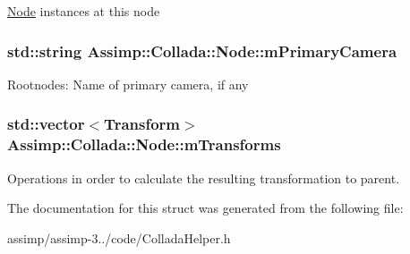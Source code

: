 \hyperlink{struct_assimp_1_1_collada_1_1_node}{Node} instances at this node \hypertarget{struct_assimp_1_1_collada_1_1_node_aa07a8151db92d1186896f934af451ad6}{
\subsubsection[{m\+Primary\+Camera}]{\setlength{\rightskip}{0pt plus 5cm}std\+::string Assimp\+::\+Collada\+::\+Node\+::m\+Primary\+Camera}}\label{struct_assimp_1_1_collada_1_1_node_aa07a8151db92d1186896f934af451ad6}
Rootnodes\+: Name of primary camera, if any \hypertarget{struct_assimp_1_1_collada_1_1_node_a13b873fd4c2a1279ff24b40cc321f901}{
\subsubsection[{m\+Transforms}]{\setlength{\rightskip}{0pt plus 5cm}std\+::vector$<${\bf Transform}$>$ Assimp\+::\+Collada\+::\+Node\+::m\+Transforms}}\label{struct_assimp_1_1_collada_1_1_node_a13b873fd4c2a1279ff24b40cc321f901}
Operations in order to calculate the resulting transformation to parent. 

The documentation for this struct was generated from the following file\+:\begin{DoxyCompactItemize}
\item 
assimp/assimp-\/3../code/Collada\+Helper.\+h\end{DoxyCompactItemize}
